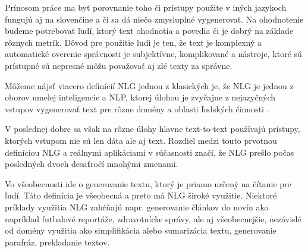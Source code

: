 Prínosom práce ma byť porovnanie toho či prístupy použite v iných jazykoch fungujú aj na slovenčine a či sa dá niečo zmysluplné vygenerovať. Na ohodnotenie budeme potrebovať ľudí, ktorý text ohodnotia a povedia či je dobrý na základe rôznych metrík. Dôvod pre použitie ludi je ten, že text je komplexný a automatické overenie správnosti je subjektívne, komplikované a nástroje, ktoré sú prístupné sú nepresné môžu považovať aj zlé texty za správne. 

Môžeme nájsť viacero definícií NLG jednou z klasických je, že NLG je
jednou z oborov umelej inteligencie a NLP, ktorej úlohou je zvyčajne z
nejazyčných vstupov vygenerovať text pre rôzne domény a oblasti
ľudských činnosti \cite{reiter_dale_2000_buildingnlgsystems}.

V poslednej dobre sa však na rôzne úlohy hlavne text-to-text používajú
prístupy, ktorých vstupom nie sú len dáta ale aj
text\cite{Nallapati_2016_sum_s2s, Nisioi_2017_simpl_expl,
Mallinson_2017_para_w_mt}. Rozdiel medzi touto prvotnou definíciou NLG
a reálnymi aplikáciami v súčasnosti značí, že NLG prešlo počas
posledných dvoch desaťročí mnohými zmenami.

Vo všeobecnosti ide o generovanie textu, ktorý je priamo určený na
čítanie pre ľudí. Táto definícia je všeobecná a preto má NLG široké
využitie. Niektoré príklady využitia NLG zahŕňajú napr. generovanie
článkov do novín ako napríklad futbalové
reportáže\cite{vanderlee_krahmer_wubben_2017_PASS}, zdravotnícke
správy, ale aj všeobecnejšie, nezávislé od domény využitia ako
simplifikácia alebo sumarizácia textu, generovanie parafráz,
prekladanie textov\cite{gatt_2018_survey}.
